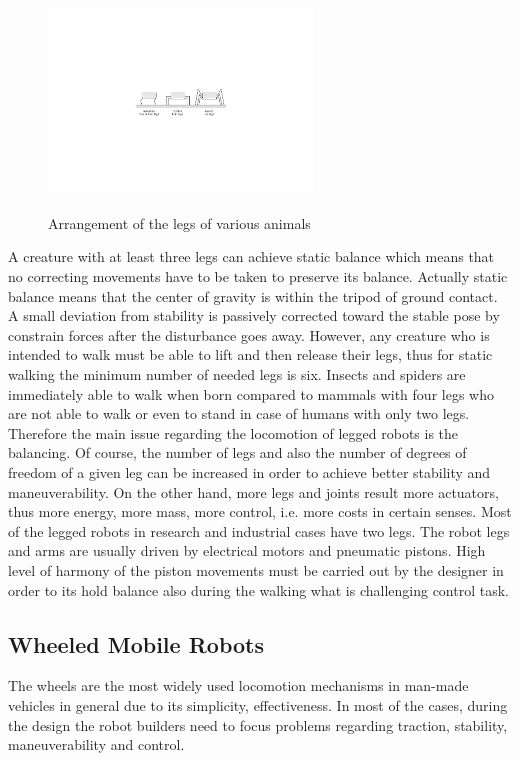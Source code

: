 \documentclass[12pt,english]{article}
\begin{document}
\begin{figure}[h]
	\centering
	\includegraphics[width=7cm]{figures/legged2.pdf}
	\label{legged}
	\caption{Arrangement of the legs of various animals}
\end{figure}

A creature with at least three legs can achieve static balance which means that no correcting movements have to be taken to preserve its balance. Actually static balance means that the center of gravity is within the tripod of ground contact. A small deviation from stability is passively corrected toward the stable pose by constrain forces after the disturbance goes away. However, any creature who is intended to walk must be able to lift and then release their legs, thus for static walking the minimum number of needed legs is six. Insects and spiders are immediately able to walk when born compared to mammals with four legs who are not able to walk or even to stand in case of humans with only two legs. Therefore the main issue regarding the locomotion of legged robots is the balancing. Of course, the number of legs and also the number of degrees of freedom of a given leg can be increased in order to achieve better stability and maneuverability. On the other hand, more legs and joints result more actuators, thus more energy, more mass, more control, i.e. more costs in certain senses. Most of the legged robots in research and industrial cases have two legs.
The robot legs and arms are usually driven by electrical motors and pneumatic pistons. High level of harmony of the piston movements must be carried out by the designer in order to its hold balance also during the walking what is challenging control task.

\subsection{Wheeled Mobile Robots}
The wheels are the most widely used locomotion mechanisms in man-made vehicles in general due to its simplicity, effectiveness. In most of the cases, during the design the robot builders need to focus problems regarding traction, stability, maneuverability and control. 
\end{document}
